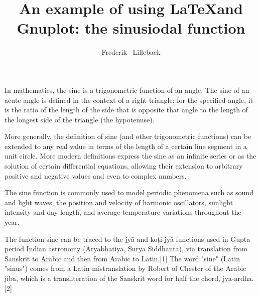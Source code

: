 \documentclass[twocolumn]{article}
\title{An example of using \LaTeX and Gnuplot: the sinusiodal function}
\author{Frederik ~Lillebaek}
\begin{document}
\maketitle
In mathematics, the sine is a trigonometric function of an angle. The sine of an acute angle is defined in the context of a right triangle: for the specified angle, it is the ratio of the length of the side that is opposite that angle to the length of the longest side of the triangle (the hypotenuse).

More generally, the definition of sine (and other trigonometric functions) can be extended to any real value in terms of the length of a certain line segment in a unit circle. More modern definitions express the sine as an infinite series or as the solution of certain differential equations, allowing their extension to arbitrary positive and negative values and even to complex numbers.

The sine function is commonly used to model periodic phenomena such as sound and light waves, the position and velocity of harmonic oscillators, sunlight intensity and day length, and average temperature variations throughout the year.

The function sine can be traced to the jyā and koṭi-jyā functions used in Gupta period Indian astronomy (Aryabhatiya, Surya Siddhanta), via translation from Sanskrit to Arabic and then from Arabic to Latin.[1] The word "sine" (Latin "sinus") comes from a Latin mistranslation by Robert of Chester of the Arabic jiba, which is a transliteration of the Sanskrit word for half the chord, jya-ardha.[2]
\begin{figure}
    
\end{figure}
\end{document}

